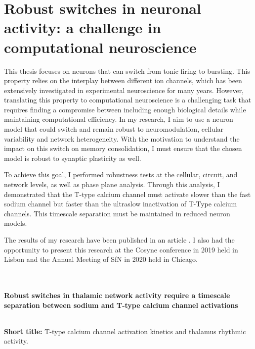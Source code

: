 \chapter{Robust switches in neuronal activity: a challenge in computational neuroscience}
\begin{shaded}
This thesis focuses on neurons that can switch from tonic firing to bursting. This property relies on the interplay between different ion channels, which has been extensively investigated in experimental neuroscience for many years. However, translating this property to computational neuroscience is a challenging task that requires finding a compromise between including enough biological details while maintaining computational efficiency.  In my research, I aim to use a neuron model that could switch and remain robust to neuromodulation, cellular variability and network heterogeneity. With the motivation to understand the impact on this switch on memory consolidation, I must ensure that the chosen model is robust to synaptic plasticity as well. 


To achieve this goal, I performed robustness tests at the cellular, circuit, and network levels, as well as phase plane analysis. Through this analysis, I demonstrated that the T-type calcium channel must activate slower than the fast sodium channel but faster than the ultraslow inactivation of T-Type calcium channels. This timescale separation must be maintained in reduced neuron models.

The results of my research have been published in an article \citep{jacquerie_robust_2021}. I also had the opportunity to present this research at the Cosyne conference in 2019 held in Lisbon and the Annual Meeting of SfN in 2020 held in Chicago.

\end{shaded}



~\\
~\\
{\Large
\textbf{Robust switches in thalamic network activity require a timescale separation between sodium and T-type calcium channel activations}}

~\\
\textbf{Short title:} T-type calcium channel activation kinetics and thalamus rhythmic activity.\\


